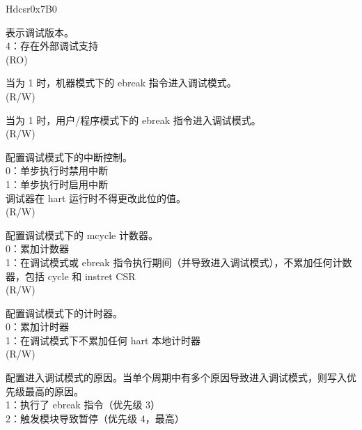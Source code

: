 
\begin{register}{H}{dcsr}{0x7B0}
\label{regdesc:DCSR}
%
%
%
%
%
%
%
%
%
%
%
%
%
%
\regnewline%
\begin{regdesc}
\begin{reglist}
\label{fielddesc:DCSRXEDBGVER}\item [xdebugver] 表示调试版本。 \\
4：存在外部调试支持\\
(RO)
\label{fielddesc:DCSREBREAKM}\item [ebreakm] 当为 1 时，机器模式下的 ebreak 指令进入调试模式。 \\
(R/W)
\label{fielddesc:DCSREBREAKU}\item [ebreaku] 当为 1 时，用户/程序模式下的 ebreak 指令进入调试模式。 \\
(R/W)
\label{fielddesc:DCSRSTEPIE}\item [stepie] 配置调试模式下的中断控制。\\
0：单步执行时禁用中断 \\
1：单步执行时启用中断 \\
调试器在 hart 运行时不得更改此位的值。\\
(R/W)
\label{fielddesc:DCSRSTOPCOUNT}\item [stopcount] 配置调试模式下的 mcycle 计数器。\\
0：累加计数器\\
1：在调试模式或 ebreak 指令执行期间（并导致进入调试模式），不累加任何计数器，包括 cycle 和 instret CSR\\
(R/W)
\label{fielddesc:DCSRSTOPTIME}\item [stoptime] 配置调试模式下的计时器。\\
0：累加计时器\\
1：在调试模式下不累加任何 hart 本地计时器 \\
(R/W)
\label{fielddesc:DCSRCAUSE}\item [cause] 配置进入调试模式的原因。当单个周期中有多个原因导致进入调试模式，则写入优先级最高的原因。\\
1：执行了 ebreak 指令（优先级 3）\\
2：触发模块导致暂停（优先级 4，最高）\\

\end{reglist}
\end{regdesc}
\end{register}
